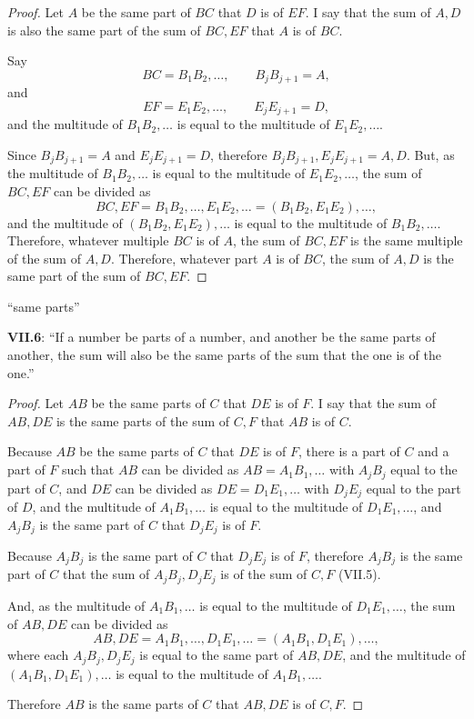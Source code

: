 \documentclass{article}
\begin{document}
\begin{proof}
Let $A$ be the same part of $BC$ that $D$ is of $EF$. 
I say that the sum of $A,D$ is also the same part of the sum of $BC,EF$ that $A$ is of $BC$. 

Say
\[
BC = B_1B_2,\ldots,\qquad B_jB_{j+1}=A,
\]
and
\[
EF = E_1E_2,\ldots, \qquad E_jE_{j+1}=D,
\]
and the multitude of $B_1B_2,\ldots$ is equal to the multitude of $E_1E_2,\ldots$. 

Since $B_jB_{j+1}=A$ and $E_jE_{j+1}=D$,  therefore
 $B_jB_{j+1},E_jE_{j+1}=A,D$.
But, as the multitude of $B_1B_2,\ldots$ is equal to the multitude of $E_1E_2,\ldots$, the sum of $BC,EF$ can be divided as 
\[
BC,EF = B_1B_2,\ldots, E_1E_2,\ldots
=(B_1B_2,E_1E_2),\ldots,
\]
and the multitude of $(B_1B_2,E_1E_2),\ldots$ is equal to the multitude of $B_1B_2,\ldots$.
Therefore, whatever multiple $BC$ is of $A$, the sum of $BC,EF$ is the same multiple of the sum of $A,D$. 
Therefore, whatever part $A$ is of $BC$, the sum of $A,D$ is the same part of the sum of $BC,EF$.
\end{proof}

``same parts''

\textbf{VII.6}: ``If a number be parts of a number, and another be the same parts of another, the sum will also be the same parts of the sum
that the one is of the one.''

\begin{proof}
Let $AB$ be the same parts of $C$ that $DE$ is of $F$.
I say that the sum of $AB,DE$ is the same parts of the sum of $C,F$ that $AB$ is of $C$.

Because $AB$ be the same parts of $C$ that $DE$ is of $F$, there is a part of $C$ and a part of $F$ such that 
$AB$ can be divided as
$AB=A_1B_1,\ldots$ with $A_jB_j$ equal to the part of $C$,
and $DE$ can be divided as $DE=D_1E_1,\ldots$ with $D_jE_j$ equal to the part of $D$, and 
the multitude of $A_1B_1,\ldots$ is equal to the multitude of $D_1E_1,\ldots$, and
$A_jB_j$ is the same part of $C$ that $D_jE_j$ is of $F$.

Because $A_jB_j$ is the same part of $C$ that $D_jE_j$ is of $F$,
therefore
$A_jB_j$ is the same part of $C$ that the sum of $A_jB_j,D_jE_j$ is of the sum of $C,F$ (VII.5).

And, as the multitude of $A_1B_1,\ldots$ is equal to the multitude of $D_1E_1,\ldots$, the sum of $AB,DE$ can be divided as 
\[
AB,DE = A_1B_1,\ldots, D_1E_1,\ldots
=(A_1B_1,D_1E_1),\ldots,
\]
where each $A_jB_j,D_jE_j$ is equal to the same part of $AB,DE$,
and the multitude of $(A_1B_1,D_1E_1),\ldots$ is equal to the multitude of $A_1B_1,\ldots$.

Therefore $AB$ is the same parts of $C$ that $AB,DE$ is of $C,F$.
\end{proof}
\end{document}
